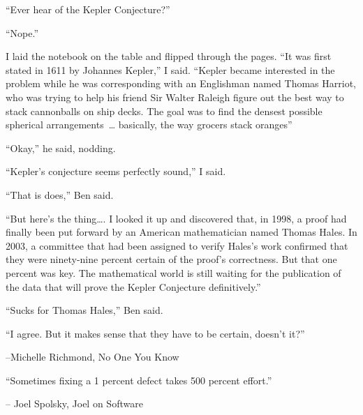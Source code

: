 {

\narrower\parindent=0pt
\baselineskip

{\it

``Ever hear of the Kepler Conjecture?''

``Nope.''

I laid the notebook on the table and flipped through the pages. ``It was first stated
in 1611 by Johannes Kepler,'' I said.  ``Kepler became interested in the problem while
he was corresponding with an Englishman named Thomas Harriot, who was trying
to help his friend Sir Walter Raleigh figure out the best way to stack cannonballs on ship
decks.  The goal was to find the densest possible spherical arrangements~\dots{}  basically,
the way grocers stack oranges''

``Okay,'' he said, nodding.

``Kepler's conjecture {\rm{seems}} perfectly sound,'' I said.

``That is does,'' Ben said.

``But here's the thing\dots.   I looked it up and discovered that, in 1998, a proof
had finally been put forward by an American mathematician named Thomas Hales.  In 2003,
a committee that had been assigned to verify Hales's work confirmed that they were ninety-nine
percent certain of the proof's correctness.  But that one percent was key.  The mathematical
world is still waiting for the publication of the data that will prove the Kepler Conjecture definitively.''

``Sucks for Thomas Hales,'' Ben said.

``I agree.  But it makes sense that they have to be certain, doesn't it?''


{\hfill\rm--Michelle Richmond, No One You Know~\cite{Richmond}} %

}

}


\bigskip

{

\narrower\parindent=0pt
\baselineskip

{\it

``Sometimes fixing a 1 percent defect takes 500 percent effort.''

{\hfill\rm-- Joel Spolsky, Joel on Software~\cite{Spolsky}} %

}

}

\bigskip

